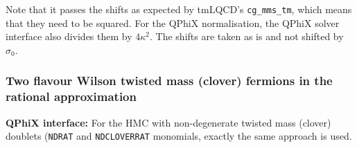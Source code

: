 Note that it passes the shifts as expected by tmLQCD's \texttt{cg\_mms\_tm}, which means that they need to be squared.
For the QPhiX normalisation, the QPhiX solver interface also divides them by $4\kappa^2$.
The shifts are taken as is and not shifted by $\sigma_0$.

\subsubsection{Two flavour Wilson twisted mass (clover) fermions in the rational approximation}

\textbf{QPhiX interface:} For the HMC with non-degenerate twisted mass (clover) doublets (\texttt{NDRAT} and \texttt{NDCLOVERRAT} monomials, exactly the same approach is used.

